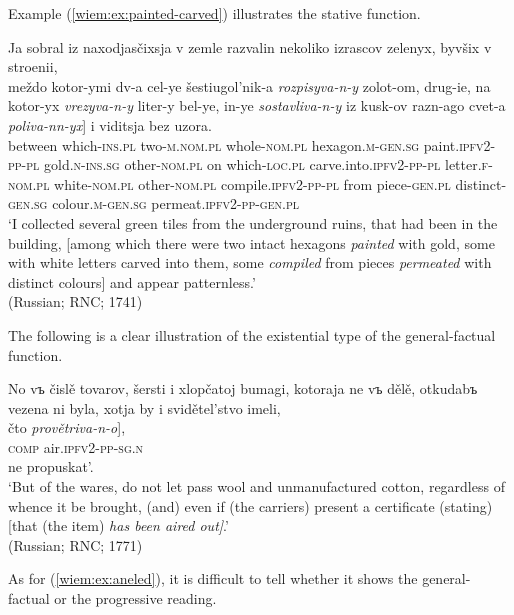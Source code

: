 \documentclass[output=paper]{langscibook}
\begin{document}
\noindent Example (\ref{wiem:ex:painted-carved}) illustrates the stative function.

\ea\label{wiem:ex:painted-carved}
{Ja sobral iz naxodjasčixsja v zemle razvalin nekoliko izrascov zelenyx, byvšix v stroenii,}\\
\gll \minsp{[} {meždo} {kotor-ymi} {dv-a} {cel-ye} {šestiugol’nik-a} {\textit{rozpisyva-n-y}} {zolot-om,} {drug-ie,} {na} {kotor-yx} {\textit{vrezyva-n-y}} {liter-y} {bel-ye,} {in-ye} {\textit{sostavliva-n-y}} {iz} {kusk-ov} {razn-ago} {cvet-a} {\textit{poliva-nn-yx}}] {i viditsja bez uzora.}\\
{} between which-\textsc{ins.pl} two-\textsc{m.nom.pl} whole-\textsc{nom.pl} hexagon.\textsc{m-gen.sg} paint.\textsc{ipfv2-pp-pl} gold.\textsc{n-ins.sg} other-\textsc{nom.pl} on which-\textsc{loc.pl} carve.into.\textsc{ipfv2-pp-pl} letter.\textsc{f-nom.pl} white-\textsc{nom.pl} other-\textsc{nom.pl} compile.\textsc{ipfv2-pp-pl} from piece-\textsc{gen.pl} distinct-\textsc{gen.sg} colour.\textsc{m-gen.sg} permeat.\textsc{ipfv2-pp-gen.pl}\\
\glt ‘I collected several green tiles from the underground ruins, that had been in the building, [among which there were two intact hexagons \textit{painted} with gold, some with white letters carved into them, some \textit{compiled} from pieces \textit{permeated} with distinct colours] and appear patternless.’ \\ \hfill (Russian; RNC; 1741)
\z

\noindent The following is a clear illustration of the existential type of the general-factual function.

\ea\label{wiem:ex:aired-out}
{No vъ čislě tovarov, šersti i xlopčatoj bumagi, kotoraja ne vъ dělě, otkudabъ vezena ni byla, xotja by i svidětel’stvo imeli,}\\
\gll \minsp{[} {čto} {\textit{provětriva-n-o}}],\\ 
{} \textsc{comp} air.\textsc{ipfv2-pp-sg.n}\\
{ne propuskat’.}\\
\glt ‘But of the wares, do not let pass wool and unmanufactured cotton, regardless of whence it be brought, (and) even if (the carriers) present a certificate (stating) [that (the item) \textit{has been aired out]}.’ \\
\hfill (Russian; RNC; 1771)
\z

\noindent As for (\ref{wiem:ex:aneled}), it is difficult to tell whether it shows the general-factual or the progressive reading.
\end{document}
